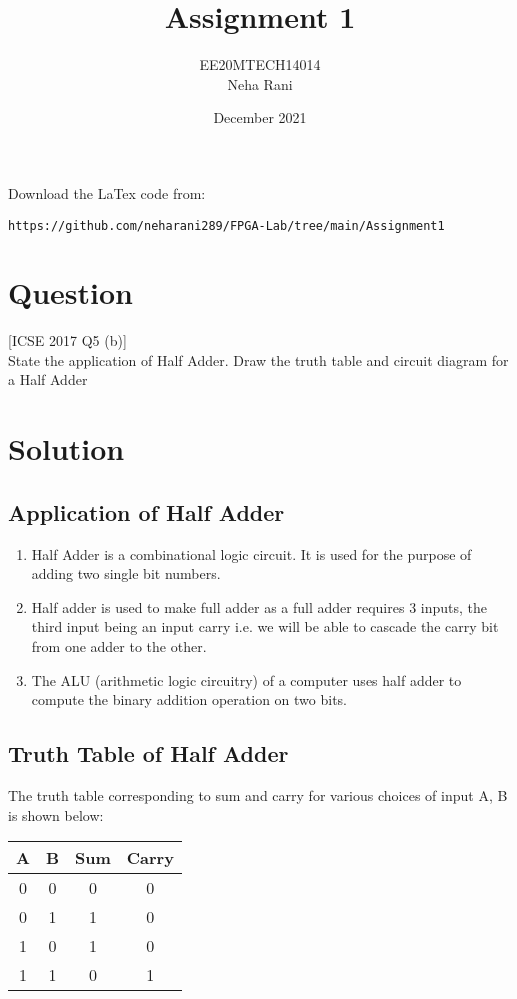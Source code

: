 \documentclass[journal,12pt,twocolumn]{IEEEtran}
\title{Assignment 1}
\author{EE20MTECH14014 \\ Neha Rani}
\date{December 2021}
\numberwithin{equation}{section}
\begin{document}
\maketitle
Download the LaTex code from:
\begin{lstlisting}
https://github.com/neharani289/FPGA-Lab/tree/main/Assignment1
\end{lstlisting}

\section{Question}
\vspace{15pt}

[ICSE 2017 Q5 (b)]\\
State the application of Half Adder. Draw the truth table and circuit diagram for a Half Adder


\section{Solution}
\subsection{Application of Half Adder}
\begin{enumerate}
    \item Half Adder is a combinational logic circuit.
It is used for the purpose of adding two single bit numbers.\\
\item Half adder is used to make full adder as a full adder requires 3 inputs, the third input being an input carry i.e. we will be able to cascade the carry bit from one adder to the other.\\
\item The ALU (arithmetic logic circuitry) of a computer uses half adder to compute the binary addition operation on two bits.\\
\end{enumerate}

\subsection{Truth Table of Half Adder}
\space
The truth table corresponding to sum and carry for various choices of input A, B is shown below:\\
\medskip

    \centering
          \begin{tabular}{|c|c|c|c|}
            \hline
            A & B & Sum & Carry \\
            \hline
            0 & 0 & 0 & 0\\
            \hline
             0 & 1 & 1 & 0\\
            \hline
             1 & 0 & 1 & 0\\
            \hline
             1 & 1 & 0 & 1\\
            \hline
        \end{tabular}
        \vspace{100pt}
\end{document}
